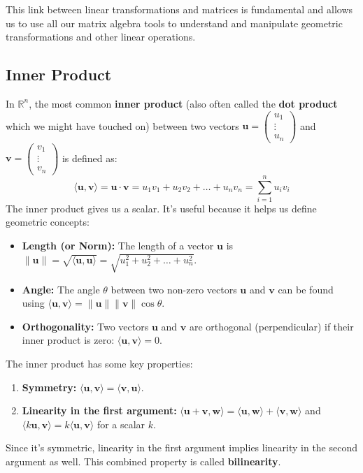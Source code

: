 \documentclass[11pt]{article}
\begin{document}
This link between linear transformations and matrices is fundamental and allows us to use all our matrix algebra tools to understand and manipulate geometric transformations and other linear operations.

\subsection{Inner Product}
In $\mathbb{R}^n$, the most common \textbf{inner product} (also often called the \textbf{dot product} which we might have touched on) between two vectors $\mathbf{u} = \begin{pmatrix} u_1 \\ \vdots \\ u_n \end{pmatrix}$ and $\mathbf{v} = \begin{pmatrix} v_1 \\ \vdots \\ v_n \end{pmatrix}$ is defined as:
\[ \langle \mathbf{u}, \mathbf{v} \rangle = \mathbf{u} \cdot \mathbf{v} = u_1v_1 + u_2v_2 + \dots + u_nv_n = \sum_{i=1}^n u_i v_i \]
The inner product gives us a scalar. It's useful because it helps us define geometric concepts:
\begin{itemize}
    \item \textbf{Length (or Norm):} The length of a vector $\mathbf{u}$ is $\|\mathbf{u}\| = \sqrt{\langle \mathbf{u}, \mathbf{u} \rangle} = \sqrt{u_1^2 + u_2^2 + \dots + u_n^2}$.
    \item \textbf{Angle:} The angle $\theta$ between two non-zero vectors $\mathbf{u}$ and $\mathbf{v}$ can be found using $\langle \mathbf{u}, \mathbf{v} \rangle = \|\mathbf{u}\| \|\mathbf{v}\| \cos\theta$.
    \item \textbf{Orthogonality:} Two vectors $\mathbf{u}$ and $\mathbf{v}$ are orthogonal (perpendicular) if their inner product is zero: $\langle \mathbf{u}, \mathbf{v} \rangle = 0$.
\end{itemize}
The inner product has some key properties:
\begin{enumerate}
    \item \textbf{Symmetry:} $\langle \mathbf{u}, \mathbf{v} \rangle = \langle \mathbf{v}, \mathbf{u} \rangle$.
    \item \textbf{Linearity in the first argument:}
        $\langle \mathbf{u} + \mathbf{v}, \mathbf{w} \rangle = \langle \mathbf{u}, \mathbf{w} \rangle + \langle \mathbf{v}, \mathbf{w} \rangle$
        and $\langle k\mathbf{u}, \mathbf{v} \rangle = k \langle \mathbf{u}, \mathbf{v} \rangle$ for a scalar $k$.
\end{enumerate}
Since it's symmetric, linearity in the first argument implies linearity in the second argument as well. This combined property is called \textbf{bilinearity}.
\end{document}
